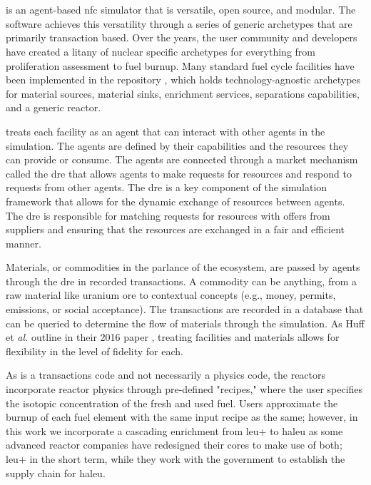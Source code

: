 \section{\cyclus}
\label{sec:cyclus}
\cyclus is an agent-based \gls{nfc} simulator that is versatile, open source, and modular. The software achieves this versatility through a series of generic archetypes that are primarily transaction based. Over the years, the user community and developers have created a litany of nuclear specific archetypes for everything from proliferation assessment to fuel burnup. Many standard fuel cycle facilities have been implemented in the \cycamore repository \cite{Carlsen_cycamore_2014}, which holds technology-agnostic archetypes for material sources, material sinks, enrichment services, separations capabilities, and a generic reactor.

\cyclus treats each facility as an agent that can interact with other agents in the simulation. The agents are defined by their capabilities and the resources they can provide or consume. The agents are connected through a market mechanism called the \gls{dre} that allows agents to make requests for resources and respond to requests from other agents. The \gls{dre} is a key component of the \cyclus simulation framework that allows for the dynamic exchange of resources between agents. The \gls{dre} is responsible for matching requests for resources with offers from suppliers and ensuring that the resources are exchanged in a fair and efficient manner.

Materials, or commodities in the parlance of the \cyclus ecosystem, are passed by agents through the \gls{dre} in recorded transactions. A commodity can be anything, from a raw material like uranium ore to contextual concepts (e.g., money, permits, emissions, or social acceptance). The transactions are recorded in a database that can be queried to determine the flow of materials through the simulation. As Huff et \textit{al.} outline in their 2016 paper \cite{huff_cyclus_intro_2016}, treating facilities and materials allows for flexibility in the level of fidelity for each.

As \cyclus is a transactions code and not necessarily a physics code,
the reactors incorporate reactor physics through pre-defined "recipes,"
where the user specifies the isotopic concentration of the fresh and
used fuel. Users approximate the burnup of each fuel element with the
same input recipe as the same; however, in this work we incorporate a
cascading enrichment from \gls{leu+} to \gls{haleu} as some advanced reactor companies have redesigned their cores to make use of both; \gls{leu+} in the short term, while they work with the government to establish the supply chain for \gls{haleu}.

